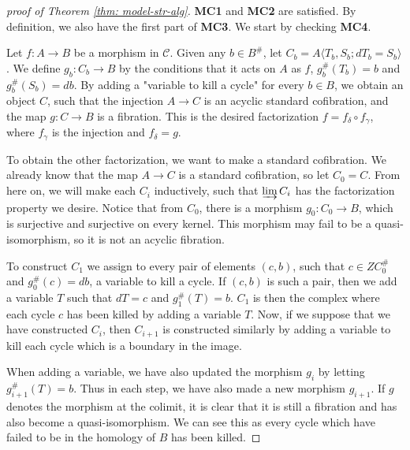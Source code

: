 \documentclass[../thesis.tex]{subfiles}
\begin{document}
            \begin{proof}[proof of Theorem \ref{thm: model-str-alg}]
                \textbf{MC1} and \textbf{MC2} are satisfied. By definition, we also have the first part of \textbf{MC3}. We start by checking \textbf{MC4}.

                Let $f:A\rightarrow B$ be a morphism in $\mathcal{C}$. Given any $b\in B^\#$, let $C_b = A\langle T_b,S_b; dT_b = S_b\rangle$. We define $g_b: C_b \rightarrow B$ by the conditions that it acts on $A$ as $f$, $g_b^\#(T_b) = b$ and $g_b^\#(S_b)=db$. By adding a "variable to kill a cycle" for every $b\in B$, we obtain an object $C$, such that the injection $A \rightarrow C$ is an acyclic standard cofibration, and the map $g: C \rightarrow B$ is a fibration. This is the desired factorization $f = f_\delta\circ f_\gamma$, where $f_\gamma$ is the injection and $f_\delta = g$.

                To obtain the other factorization, we want to make a standard cofibration. We already know that the map $A\rightarrow C$ is a standard cofibration, so let $C_0 = C$. From here on, we will make each $C_i$ inductively, such that $\varinjlim C_i$ has the factorization property we desire. Notice that from $C_0$, there is a morphism $g_0: C_0 \rightarrow B$, which is surjective and surjective on every kernel. This morphism may fail to be a quasi-isomorphism, so it is not an acyclic fibration.
                
                To construct $C_1$ we assign to every pair of elements $(c,b)$, such that $c\in ZC_0^\#$ and $g_0^\#(c) = db$, a variable to kill a cycle. If $(c,b)$ is such a pair, then we add a variable $T$ such that $dT = c$ and $g_1^\#(T)=b$. $C_1$ is then the complex where each cycle $c$ has been killed by adding a variable $T$. Now, if we suppose that we have constructed $C_i$, then $C_{i+1}$ is constructed similarly by adding a variable to kill each cycle which is a boundary in the image.

                When adding a variable, we have also updated the morphism $g_i$ by letting $g_{i+1}^\#(T) = b$. Thus in each step, we have also made a new morphism $g_{i+1}$. If $g$ denotes the morphism at the colimit, it is clear that it is still a fibration and has also become a quasi-isomorphism. We can see this as every cycle which have failed to be in the homology of $B$ has been killed. 
                

\end{proof}
\end{document}
